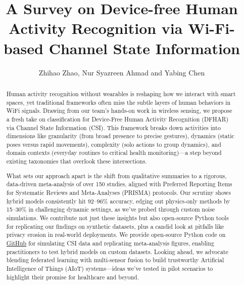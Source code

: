 \documentclass[Afour,sageh,times]{sagej}
\begin{document}

\title{A Survey on Device-free Human Activity Recognition via Wi-Fi-based Channel State Information}

\author{Zhihao Zhao, Nur Syazreen Ahmad and  Yabing Chen}




\begin{abstract}
Human activity recognition without wearables is reshaping how we interact with smart spaces, yet traditional frameworks often miss the subtle layers of human behaviors in WiFi signals. Drawing from our team's hands-on work in wireless sensing, we propose a fresh take on classification for Device-Free Human Activity Recognition (DFHAR) via Channel State Information (CSI). This framework breaks down activities into dimensions like granularity (from broad presence to precise gestures), dynamics (static poses versus rapid movements), complexity (solo actions to group dynamics), and domain contexts (everyday routines to critical health monitoring)—a step beyond existing taxonomies that overlook these intersections.

What sets our approach apart is the shift from qualitative summaries to a rigorous, data-driven meta-analysis of over 150 studies, aligned with Preferred Reporting Items for Systematic Reviews and Meta-Analyses (PRISMA) protocols. Our scrutiny shows hybrid models consistently hit 92–96\% accuracy, edging out physics-only methods by 15–30\% in challenging dynamic settings, as we've probed through custom noise simulations. We contribute not just these insights but also open-source Python tools for replicating our findings on synthetic datasets, plus a candid look at pitfalls like privacy erosion in real-world deployments. We provide open-source Python code on  \href{https://github.com/zhihaozhao/DFHAR/blob/master/hybridHAR0727.ipynb}{GitHub} for simulating CSI data and replicating meta-analysis figures, enabling practitioners to test hybrid models on custom datasets. Looking ahead, we advocate blending federated learning with multi-sensor fusion to build trustworthy Artificial Intelligence of Things (AIoT) systems—ideas we've tested in pilot scenarios to highlight their promise for healthcare and beyond.
\end{abstract}
\end{document}
